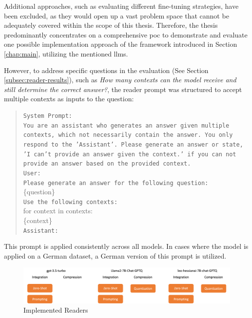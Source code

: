 Additional approaches, such as evaluating different fine-tuning strategies, have been excluded, as they would open up a vast problem space that cannot be adequately covered within the scope of this thesis. Therefore, the thesis predominantly concentrates on a comprehensive \gls{poc} to demonstrate and evaluate one possible implementation approach of the framework introduced in Section \ref{chap:main}, utilizing the mentioned \gls{llm}s.

However, to address specific questions in the evaluation (See Section \ref{subsec:reader-results}), such as \textit{How many contexts can the model receive and still determine the correct answer?}, the reader prompt was structured to accept multiple contexts as inputs to the question:

\begin{quote}
    \texttt{System Prompt:} \\
    \texttt{You are an assistant who generates an answer given multiple contexts, which not necessarily contain the answer. You only respond to the 'Assistant'. Please generate an answer or state, 'I can't provide an answer given the context.' if you can not provide an answer based on the provided context.} \\
    \texttt{User:} \\
    \texttt{Please generate an answer for the following question:} \\
    \{question\} \\
    \texttt{Use the following contexts:} \\
    for context in contexts: \\
    \hspace*{1cm}\{context\} \\
    \texttt{Assistant:} \\
\end{quote}

This prompt is applied consistently across all models. In cases where the model is applied on a German dataset, a German version of this prompt is utilized.


\begin{figure}
    \centering
    \includegraphics[width=\textwidth]{Grafiken/Evaluation/reader_implemented.png}
    \caption{Implemented Readers}
    \label{fig:reader-implementation}
\end{figure}

